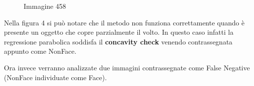 \documentclass[
  italian,
]{article}
\begin{document}
\begin{figure}
\centering
{}%
\qquad
{}%
\qquad
{}%
\caption{Immagine 458}
\end{figure}
Nella figura 4 si può notare che il metodo non funziona correttamente quando è presente un oggetto che copre parzialmente il volto.
In questo caso infatti la regressione parabolica soddisfa il \textbf{concavity check} venendo contrassegnata appunto come NonFace.

\pagebreak

Ora invece verranno analizzate due immagini contrassegnate come False Negative (NonFace individuate come Face).
\end{document}

